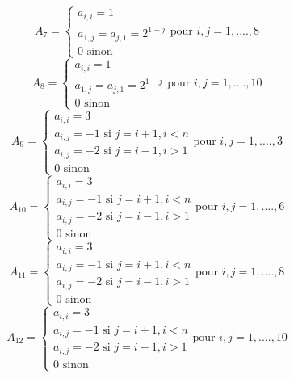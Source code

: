     \begin{equation*}
        A_7=
        \begin{cases}
            a_{i,i}=1 \\
            a_{1,j}=a_{j,1}=2^{1-j}\\
            0 \text{ sinon}
        \end{cases} \text{pour }i,j=1,....,8
    \end{equation*}
    \begin{equation*}
        A_8=
        \begin{cases}
            a_{i,i}=1 \\
            a_{1,j}=a_{j,1}=2^{1-j}\\
            0 \text{ sinon}
        \end{cases} \text{pour }i,j=1,....,10
    \end{equation*}
    \begin{equation*}
        A_9=
        \begin{cases}
            a_{i,i}=3 \\
            a_{i,j}=-1 \text{ si } j=i+1, i<n\\
            a_{i,j}=-2 \text{ si } j=i-1, i>1 \\
            0 \text{ sinon}
        \end{cases} \text{pour }i,j=1,....,3
    \end{equation*}
    \begin{equation*}
        A_{10}=
        \begin{cases}
            a_{i,i}=3 \\
            a_{i,j}=-1 \text{ si } j=i+1, i<n\\
            a_{i,j}=-2 \text{ si } j=i-1, i>1 \\
            0 \text{ sinon}
        \end{cases} \text{pour }i,j=1,....,6
    \end{equation*}
    \begin{equation*}
        A_{11}=
        \begin{cases}
            a_{i,i}=3 \\
            a_{i,j}=-1 \text{ si } j=i+1, i<n\\
            a_{i,j}=-2 \text{ si } j=i-1, i>1 \\
            0 \text{ sinon}
        \end{cases} \text{pour }i,j=1,....,8
    \end{equation*}
    \begin{equation*}
        A_{12}=
        \begin{cases}
            a_{i,i}=3 \\
            a_{i,j}=-1 \text{ si } j=i+1, i<n\\
            a_{i,j}=-2 \text{ si } j=i-1, i>1 \\
            0 \text{ sinon}
        \end{cases} \text{pour }i,j=1,....,10
    \end{equation*}
